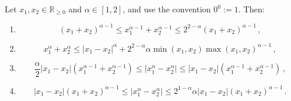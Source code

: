 \documentclass{article}
\newcommand{\R}{\mathbb{R}}
\newcommand{\Rp}{\R_{\geq0}}
\newcommand{\lb}{\left(} %
\newcommand{\rb}{\right)} %
\newcommand{\br}[1]{\lb #1 \rb} %
\newcommand{\brOf}[1]{\!\br{#1}} %
\newcommand{\absof}[1]{\vert #1 \vert} %
\newcommand{\eqcm}{\,,} %
\newcommand{\eqfs}{\,.}
\begin{document}
\begin{lemma}\label{lmm:power:ana:farvi}
    Let $x_1,x_2\in\Rp$ and $\alpha\in[1,2]$, and use the convention
    $0^0:=1$. Then:
    \begin{enumerate}[label=(\roman*)]
        \item
        \begin{equation}\label{eq:power:dsubadd}
            (x_1+x_2)^{\alpha-1}
            \leq
            x_1^{\alpha-1}+x_2^{\alpha-1}
            \leq
            2^{2-\alpha}(x_1+x_2)^{\alpha-1}
            \eqcm
        \end{equation}
        
        \item
        \begin{equation}\label{eq:power:farvi}
            x_1^\alpha+x_2^\alpha
            \leq
            \absof{x_1-x_2}^{\alpha}
            +
            2^{2-\alpha}\alpha
            \min\brOf{x_1,x_2}
            \max\brOf{x_1,x_2}^{\alpha-1}
            \eqcm
        \end{equation}
        
        \item
        \begin{equation}\label{eq:power:diff:alpha:sum}
            \frac{\alpha}{2}
            \absof{x_1-x_2}
            \br{x_1^{\alpha-1}+x_2^{\alpha-1}}
            \le
            \absof{x_1^\alpha-x_2^\alpha}
            \le
            \absof{x_1-x_2}
            \br{x_1^{\alpha-1}+x_2^{\alpha-1}}
            \eqcm
        \end{equation}
        
        \item
            \begin{equation}\label{eq:power:diff:alpha}
            \absof{x_1-x_2}
            (x_1+x_2)^{\alpha-1}
            \le
            \absof{x_1^\alpha-x_2^\alpha}
            \le
            2^{1-\alpha}\alpha
            \absof{x_1-x_2}
            (x_1+x_2)^{\alpha-1}
            \eqfs
        \end{equation}
    \end{enumerate}
\end{lemma}
%
\end{document}
